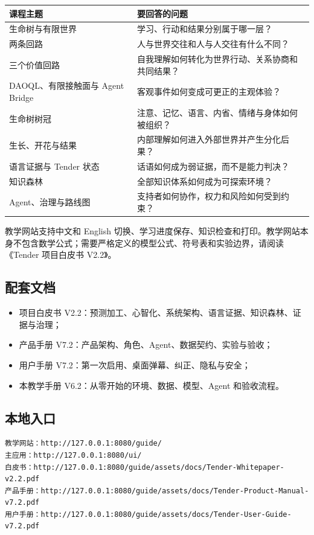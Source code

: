 \documentclass[UTF8,a4paper,11pt]{ctexart}
\begin{document}
\begin{center}
\begin{longtable}{@{}p{3.6cm}p{8.0cm}@{}}
\toprule
\textbf{课程主题} & \textbf{要回答的问题} \\
\midrule
生命树与有限世界 & 学习、行动和结果分别属于哪一层？ \\
两条回路 & 人与世界交往和人与人交往有什么不同？ \\
三个价值回路 & 自我理解如何转化为世界行动、关系协商和共同结果？ \ \\
DAOQL、有限接触面与 Agent Bridge & 客观事件如何变成可更正的主观体验？ \\
生命树树冠 & 注意、记忆、语言、内省、情绪与身体如何被组织？ \\
生长、开花与结果 & 内部理解如何进入外部世界并产生分化后果？ \\
语言证据与 Tender 状态 & 话语如何成为弱证据，而不是能力判决？ \\
知识森林 & 全部知识体系如何成为可探索环境？ \\
Agent、治理与路线图 & 支持者如何协作，权力和风险如何受到约束？ \\
\bottomrule
\end{longtable}
\end{center}

教学网站支持中文和 English 切换、学习进度保存、知识检查和打印。教学网站本身不包含数学公式；需要严格定义的模型公式、符号表和实验边界，请阅读《Tender 项目白皮书 V2.2》。

\subsection{配套文档}

\begin{itemize}
\item 项目白皮书 V2.2：预测加工、心智化、系统架构、语言证据、知识森林、证据与治理；
\item 产品手册 V7.2：产品架构、角色、Agent、数据契约、实验与验收；
\item 用户手册 V7.2：第一次启用、桌面弹幕、纠正、隐私与安全；
\item 本教学手册 V6.2：从零开始的环境、数据、模型、Agent 和验收流程。
\end{itemize}

\subsection{本地入口}

\begin{verbatim}
教学网站：http://127.0.0.1:8080/guide/
主应用：http://127.0.0.1:8080/ui/
白皮书：http://127.0.0.1:8080/guide/assets/docs/Tender-Whitepaper-v2.2.pdf
产品手册：http://127.0.0.1:8080/guide/assets/docs/Tender-Product-Manual-v7.2.pdf
用户手册：http://127.0.0.1:8080/guide/assets/docs/Tender-User-Guide-v7.2.pdf
\end{verbatim}
\end{document}
